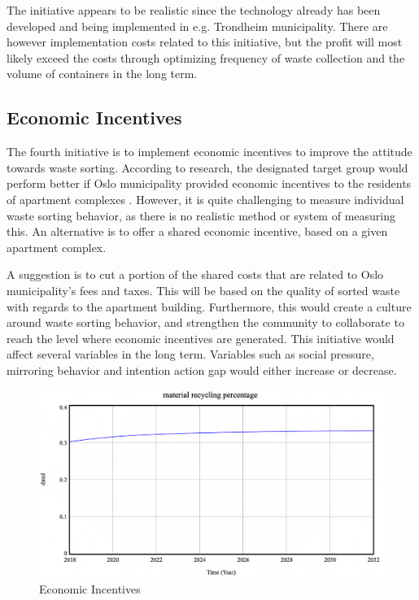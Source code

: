 \indent \newline
The initiative appears to be realistic since the technology already has been developed and being implemented in e.g. Trondheim municipality. There are however implementation costs related to this initiative, but the profit will most likely exceed the costs through optimizing frequency of waste collection and the volume of containers in the long term. 

\subsection{Economic Incentives}

\indent \newline
The fourth initiative is to implement economic incentives to improve the attitude towards waste sorting. According to research, the designated target group would perform better if Oslo municipality provided economic incentives to the residents of apartment complexes \cite[p. 46]{Mikkelborg}. However, it is quite challenging to measure individual waste sorting behavior, as there is no realistic method or system of measuring this. An alternative is to offer a shared economic incentive, based on a given apartment complex. 

\indent \newline
A suggestion is to cut a portion of the shared costs that are related to Oslo municipality's fees and taxes. This will be based on the quality of sorted waste with regards to the apartment building. Furthermore, this would create a culture around waste sorting behavior, and strengthen the community to collaborate to reach the level where economic incentives are generated. This initiative would affect several variables in the long term. Variables such as social pressure, mirroring behavior and intention action gap would either increase or decrease.

\begin{figure}[H]
\centering
\includegraphics [scale=0.28,angle=360]{figures/incentives.png}
\caption{Economic Incentives}
\label{fig:incentives}
\end{figure}

